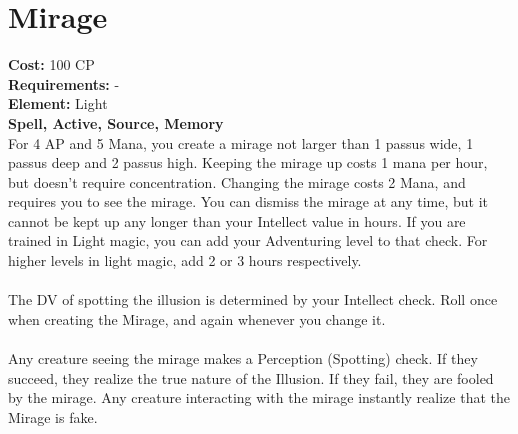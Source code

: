 \section{Mirage}
\textbf{Cost:} 100 CP\\
\textbf{Requirements:} -\\
\textbf{Element:} Light\\
\textbf{Spell, Active, Source, Memory}\\
For 4 AP and 5 Mana, you create a mirage not larger than 1 passus wide, 1 passus deep and 2 passus high. Keeping the mirage up costs 1 mana per hour, but doesn't require concentration. Changing the mirage costs 2 Mana, and requires you to see the mirage. You can dismiss the mirage at any time, but it cannot be kept up any longer than your Intellect value in hours. If you are trained in Light magic, you can add your Adventuring level to that check. For higher levels in light magic, add 2 or 3 hours respectively.\\
\\
The DV of spotting the illusion is determined by your Intellect check. Roll once when creating the Mirage, and again whenever you change it. \\
\\
Any creature seeing the mirage makes a Perception (Spotting) check. If they succeed, they realize the true nature of the Illusion. If they fail, they are fooled by the mirage. Any creature interacting with the mirage instantly realize that the Mirage is fake.\\